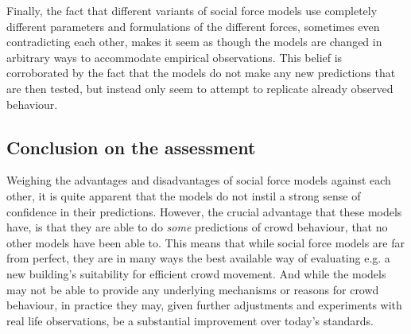 Finally, the fact that different variants of social force models use 
completely different parameters and formulations of the different forces, 
sometimes even contradicting each other, makes it seem as though the models 
are changed in arbitrary ways to accommodate empirical observations. This 
belief is corroborated by the fact that the models do not make any new 
predictions that are then tested, but instead only seem to attempt to 
replicate already observed behaviour.

\subsection{Conclusion on the assessment}
Weighing the advantages and disadvantages of social force models against each 
other, it is quite apparent that the models do not instil a strong sense of 
confidence in their predictions. However, the crucial advantage that these 
models have, is that they are able to do \emph{some} predictions of crowd 
behaviour, that no other models have been able to. This means that while 
social force models are far from perfect, they are in many ways the best 
available way of evaluating e.g. a new building's suitability for efficient 
crowd movement. And while the models may not be able to provide any underlying 
mechanisms or reasons for crowd behaviour, in practice they may, given further 
adjustments and experiments with real life observations, be a substantial 
improvement over today's standards.
